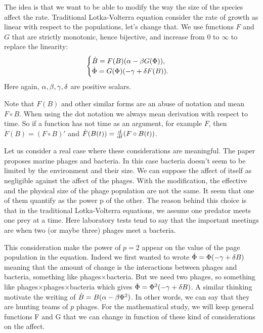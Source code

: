 The idea is that we want to be able to modify the way the size of the species affect the rate. Traditional Lotka-Volterra equation consider the rate of growth as linear with respect to the populations, let's change that. We use functions $F$ and $G$ that are strictly monotonic, hence bijective, and increase from $0$ to $\infty$ to replace the linearity:
\begin{equation} \label{eq:LV}
    \begin{cases}
    \dot{B} = F(B)(\alpha -\beta G(\Phi)), \\
    \dot{\Phi} = G(\Phi)(-\gamma +\delta F(B)).
    \end{cases}
\end{equation}
Here again, $\alpha,\beta,\gamma,\delta$ are positive scalars.

Note that $F(B)$ and other similar forms are an abuse of notation and mean $F\circ B$. When using the dot notation we always mean derivation with respect to time. So if a function has not time as an argument, for example $F$, then
$\dot{F}(B) = (F\circ B)'$ and $\dot{F}(B(t))= \frac{\mathrm{d}}{\mathrm{d} t}(F\circ B(t))$.

Let us consider a real case where these considerations are meaningful.
The paper \cite{Gav} proposes marine phages and bacteria. In this case bacteria doesn't seem to be limited by the environment and their size. We can suppose the affect of itself as negligible against the affect of the phages. With the modification, the effective and the physical size of the phage population are not the same. It seem that one of them quantify as the power p of the other. The reason behind this choice is that in the traditional Lotka-Volterra equations, we assume one predator meets one prey at a time. Here laboratory tests tend to say that the important meetings are when two (or maybe three) phages meet a bacteria.

This consideration make the power of $p=2$ appear on the value of the page population in the equation. Indeed we first wanted to wrote $\dot{\Phi}=\Phi(-\gamma+\delta B)$ meaning that the amount of change is the interactions between phages and bacteria, something like phages$\times$bacteria. But we need two phages, so something like phages$\times$phages$\times$bacteria which gives $\dot{\Phi}=\Phi^2(-\gamma+\delta B)$. A similar thinking motivate the writing of $\dot{B}=B(\alpha-\beta \Phi^2)$. In other words, we can say that they are hunting  teams of $p$ phages. For the mathematical study, we will keep general functions F and G that we can change in function of these kind of considerations on the affect.

